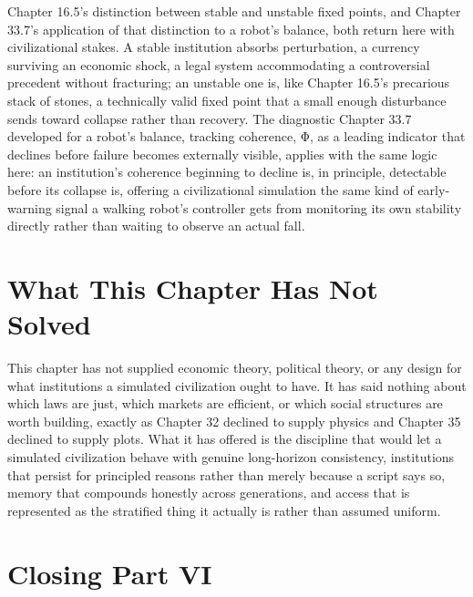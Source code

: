 Chapter 16.5's distinction between stable and unstable fixed points, and Chapter 33.7's application of that distinction to a robot's balance, both return here with civilizational stakes. A stable institution absorbs perturbation, a currency surviving an economic shock, a legal system accommodating a controversial precedent without fracturing; an unstable one is, like Chapter 16.5's precarious stack of stones, a technically valid fixed point that a small enough disturbance sends toward collapse rather than recovery. The diagnostic Chapter 33.7 developed for a robot's balance, tracking coherence, Φ, as a leading indicator that declines before failure becomes externally visible, applies with the same logic here: an institution's coherence beginning to decline is, in principle, detectable before its collapse is, offering a civilizational simulation the same kind of early-warning signal a walking robot's controller gets from monitoring its own stability directly rather than waiting to observe an actual fall.

\section{What This Chapter Has Not Solved}

This chapter has not supplied economic theory, political theory, or any design for what institutions a simulated civilization ought to have. It has said nothing about which laws are just, which markets are efficient, or which social structures are worth building, exactly as Chapter 32 declined to supply physics and Chapter 35 declined to supply plots. What it has offered is the discipline that would let a simulated civilization behave with genuine long-horizon consistency, institutions that persist for principled reasons rather than merely because a script says so, memory that compounds honestly across generations, and access that is represented as the stratified thing it actually is rather than assumed uniform.

\section{Closing Part VI}

